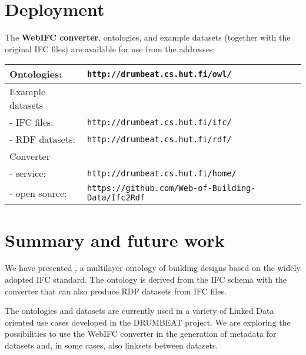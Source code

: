 \section{Deployment}

The \textbf{WebIFC converter}, \ifcowl{} ontologies, and example \ifcrdf{} datasets (together with the original IFC files) are available for use from the addresses:

\vspace{2mm}
\begin{tabular}{|l|l|}
\hline
Ontologies: & \texttt{http://drumbeat.cs.hut.fi/owl/} \\
\hline
Example datasets & \\
- IFC files: & \texttt{http://drumbeat.cs.hut.fi/ifc/} \\
- RDF datasets: & \texttt{http://drumbeat.cs.hut.fi/rdf/} \\
\hline
Converter & \\
- service: & \texttt{http://drumbeat.cs.hut.fi/home/} \\
- open source: & \texttt{https://github.com/Web-of-Building-Data/Ifc2Rdf} \\
\hline
\end{tabular}


\section{Summary and future work}
\label{sec:conclusion}

We have presented \ifcowl{}, a multilayer ontology of building designs based on the widely adopted IFC standard. The ontology is 
derived from the IFC schema with the  converter that can also produce RDF datasets from IFC files. 

The \ifcowl{} ontologies and \ifcrdf{} datasets are currently used in a variety of Linked Data oriented use cases \cite{torma2013semantic} developed in the DRUMBEAT project. We are exploring the possibilities to use the WebIFC converter in the generation of metadata for \ifcrdf{} datasets and, in some cases, also linksets between datasets.


